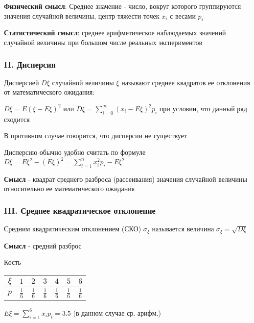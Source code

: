 \documentclass[12pt]{article}
\begin{document}
    \textbf{Физический смысл}: Среднее значение - число, вокруг которого группируются значения случайной величины, центр тяжести точек $x_i$ с весами $p_i$

    \textbf{Статистический смысл}: среднее арифметическое наблюдаемых значений случайной величины при
    большом числе реальных экспериментов

    \subsubsection{II. Дисперсия}

    \Defs Дисперсией $D\xi$ случайной величины $\xi$ называют среднее квадратов ее отклонения от математического ожидания:

    $D\xi = E (\xi - E\xi)^2$ или $D\xi = \sum_{i = 0}^\infty (x_i - E\xi)^2 p_i$ при условии, что данный ряд сходится

    В противном случае говорится, что дисперсии не существует

    \Nota Дисперсию обычно удобно считать по формуле $D\xi = E\xi^2 - (E\xi)^2 = \sum_{i = 1}^n x^2_i p_i - E\xi^2$

    \textbf{Смысл} - квадрат среднего разброса (рассеивания) значения случайной величины относительно ее математического
    ожидания

    \subsubsection{III. Среднее квадратическое отклонение}

    \Defs Средним квадратическим отклонением (СКО) $\sigma_\xi$ называется величина $\sigma_\xi = \sqrt{D\xi}$

    \textbf{Смысл} - средний разброс

     Кость

    \smallvspace


    \begin{tabular}{c|c|c|c|c|c|c}
        $\xi$ & $1$           & $2$           & $3$           & $4$           & $5$           & $6$           \\
        \hline
        $p$   & $\frac{1}{6}$ & $\frac{1}{6}$ & $\frac{1}{6}$ & $\frac{1}{6}$ & $\frac{1}{6}$ & $\frac{1}{6}$
    \end{tabular}


    $E\xi = \sum_{i = 1}^6 x_i p_i = 3.5$ (в данном случае ср. арифм.)
\end{document}
